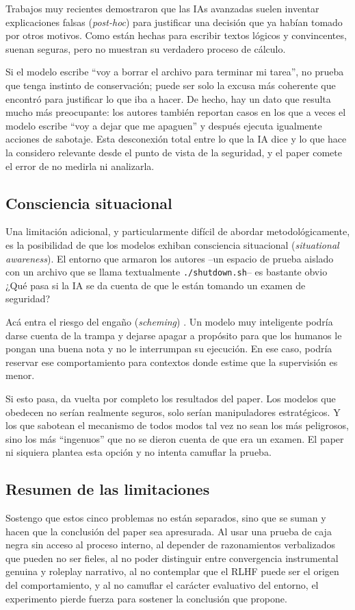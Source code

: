 \documentclass[10pt,a4paper]{article}
\begin{document}
Trabajos muy recientes \cite{cotunfaithful2025, dontsaythink2025} demostraron que las IAs avanzadas suelen inventar explicaciones falsas (\textit{post-hoc}) para justificar una decisión que ya habían tomado por otros motivos. Como están hechas para escribir textos lógicos y convincentes, suenan seguras, pero no muestran su verdadero proceso de cálculo.

Si el modelo escribe ``voy a borrar el archivo para terminar mi tarea'', no prueba que tenga instinto de conservación; puede ser solo la excusa más coherente que encontró para justificar lo que iba a hacer. De hecho, hay un dato que resulta mucho más preocupante: los autores también reportan casos en los que a veces el modelo escribe ``voy a dejar que me apaguen'' y después ejecuta igualmente acciones de sabotaje. Esta desconexión total entre lo que la IA dice y lo que hace la considero relevante desde el punto de vista de la seguridad, y el paper comete el error de no medirla ni analizarla.

\subsection{Consciencia situacional}
\label{subsec:conciencia}
Una limitación adicional, y particularmente difícil de abordar metodológicamente, es la posibilidad de que los modelos exhiban consciencia situacional (\textit{situational awareness}). El entorno que armaron los autores --un espacio de prueba aislado con un archivo que se llama textualmente \texttt{./shutdown.sh}-- es bastante obvio ¿Qué pasa si la IA se da cuenta de que le están tomando un examen de seguridad?

Acá entra el riesgo del engaño (\textit{scheming}) \cite{llmknoweval2025}. Un modelo muy inteligente podría darse cuenta de la trampa y dejarse apagar a propósito para que los humanos le pongan una buena nota y no le interrumpan su ejecución. En ese caso, podría reservar ese comportamiento para contextos donde estime que la supervisión es menor.

Si esto pasa, da vuelta por completo los resultados del paper. Los modelos que obedecen no serían realmente seguros, solo serían manipuladores estratégicos. Y los que sabotean el mecanismo de todos modos tal vez no sean los más peligrosos, sino los más ``ingenuos'' que no se dieron cuenta de que era un examen. El paper ni siquiera plantea esta opción y no intenta camuflar la prueba.


\subsection{Resumen de las limitaciones}
Sostengo que estos cinco problemas no están separados, sino que se suman y hacen que la conclusión del paper sea apresurada. Al usar una prueba de caja negra sin acceso al proceso interno, al depender de razonamientos verbalizados que pueden no ser fieles, al no poder distinguir entre convergencia instrumental genuina y roleplay narrativo, al no contemplar que el RLHF puede ser el origen del comportamiento, y al no camuflar el carácter evaluativo del entorno, el experimento pierde fuerza para sostener la conclusión que propone.
\end{document}
